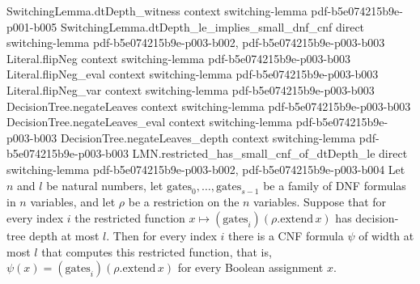 \begin{theorem}
  {SwitchingLemma.dtDepth_witness}
  {context}
  {switching-lemma}
  {pdf-b5e074215b9e-p001-b005}
\proofstep
  {SwitchingLemma.dtDepth_le_implies_small_dnf_cnf}
  {direct}
  {switching-lemma}
  {pdf-b5e074215b9e-p003-b002,
    pdf-b5e074215b9e-p003-b003}
\proofstep
  {Literal.flipNeg}
  {context}
  {switching-lemma}
  {pdf-b5e074215b9e-p003-b003}
\proofstep
  {Literal.flipNeg_eval}
  {context}
  {switching-lemma}
  {pdf-b5e074215b9e-p003-b003}
\proofstep
  {Literal.flipNeg_var}
  {context}
  {switching-lemma}
  {pdf-b5e074215b9e-p003-b003}
\proofstep
  {DecisionTree.negateLeaves}
  {context}
  {switching-lemma}
  {pdf-b5e074215b9e-p003-b003}
\proofstep
  {DecisionTree.negateLeaves_eval}
  {context}
  {switching-lemma}
  {pdf-b5e074215b9e-p003-b003}
\proofstep
  {DecisionTree.negateLeaves_depth}
  {context}
  {switching-lemma}
  {pdf-b5e074215b9e-p003-b003}
\proofstep
  {LMN.restricted_has_small_cnf_of_dtDepth_le}
  {direct}
  {switching-lemma}
  {pdf-b5e074215b9e-p003-b002,
    pdf-b5e074215b9e-p003-b004}
Let $n$ and $l$ be natural numbers, let $\mathrm{gates}_0,\dots,\mathrm{gates}_{s-1}$ be
a family of DNF formulas in $n$ variables, and let $\rho$ be a restriction on the $n$
variables. Suppose that for every index $i$ the restricted function $x \mapsto
(\mathrm{gates}_i)(\rho.\mathrm{extend}\,x)$ has decision-tree depth at most $l$. Then
for every index $i$ there is a CNF formula $\psi$ of width at most $l$ that computes
this restricted function, that is, $\psi(x) =
(\mathrm{gates}_i)(\rho.\mathrm{extend}\,x)$ for every Boolean assignment $x$.
\end{theorem}

